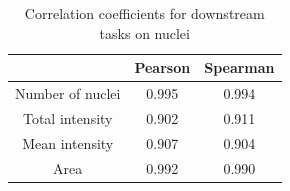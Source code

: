 \begin{table}[htb]
    \centering
    \caption{Correlation coefficients for downstream tasks on nuclei}
        \begin{adjustbox}{width=0.4\textwidth}
            \begin{tabular}{|c|c|c|}\hline
                &Pearson&Spearman
                \\\hline\hline
                Number of nuclei&0.995&0.994\\\hline
                Total intensity&0.902&0.911\\\hline
                Mean intensity&0.907&0.904\\\hline
                Area&0.992&0.990\\\hline
            \end{tabular}
        \label{table:nuclei-downstream-metrics-coefficients}
        \end{adjustbox}
\end{table}
